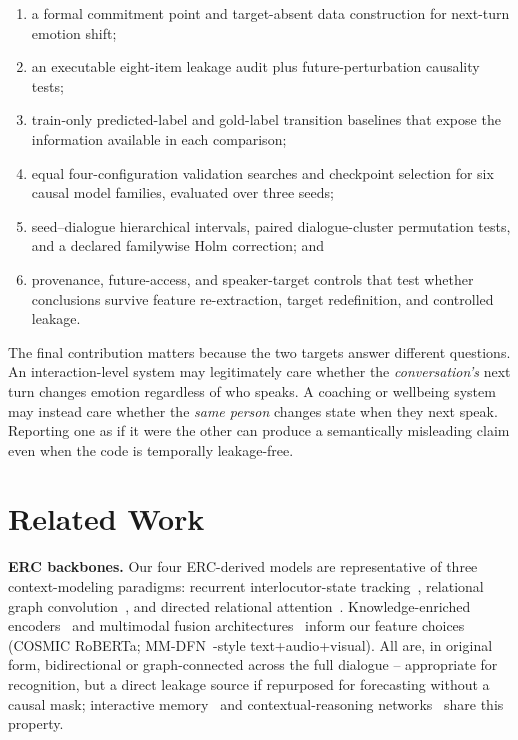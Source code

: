 \documentclass{ieeeaccess}
\begin{document}
\begin{enumerate}
\item a formal commitment point and target-absent data construction for next-turn emotion shift;
\item an executable eight-item leakage audit plus future-perturbation causality tests;
\item train-only predicted-label and gold-label transition baselines that expose the information
available in each comparison;
\item equal four-configuration validation searches and checkpoint selection for six causal model
families, evaluated over three seeds;
\item seed--dialogue hierarchical intervals, paired dialogue-cluster permutation tests, and a
declared familywise Holm correction; and
\item provenance, future-access, and speaker-target controls that test whether conclusions survive
feature re-extraction, target redefinition, and controlled leakage.
\end{enumerate}

The final contribution matters because the two targets answer different questions. An
interaction-level system may legitimately care whether the \emph{conversation's} next turn changes
emotion regardless of who speaks. A coaching or wellbeing system may instead care whether the
\emph{same person} changes state when they next speak. Reporting one as if it were the other can
produce a semantically misleading claim even when the code is temporally leakage-free.

\section{Related Work}

\textbf{ERC backbones.} Our four ERC-derived models are representative of three context-modeling
paradigms: recurrent interlocutor-state tracking~\cite{majumder2019dialoguernn}, relational graph
convolution~\cite{ghosal2019dialoguegcn,ai2023dergcn}, and directed relational
attention~\cite{shen2021dagerc}. Knowledge-enriched encoders~\cite{zhong2019ket,ghosal2020cosmic}
and multimodal fusion architectures~\cite{tsai2019mult,hu2021mmgcn,hazarika2020misa,li2023ga2mif,meng2024mglra}
inform our feature choices (COSMIC RoBERTa; MM-DFN~\cite{hu2021mmdfn}-style
text+audio+visual). All are, in original form, bidirectional or graph-connected across the full
dialogue -- appropriate for recognition, but a direct leakage source if repurposed for forecasting
without a causal mask; interactive memory~\cite{hazarika2018icon} and contextual-reasoning
networks~\cite{hu2021dialoguecrn} share this property.
\end{document}
